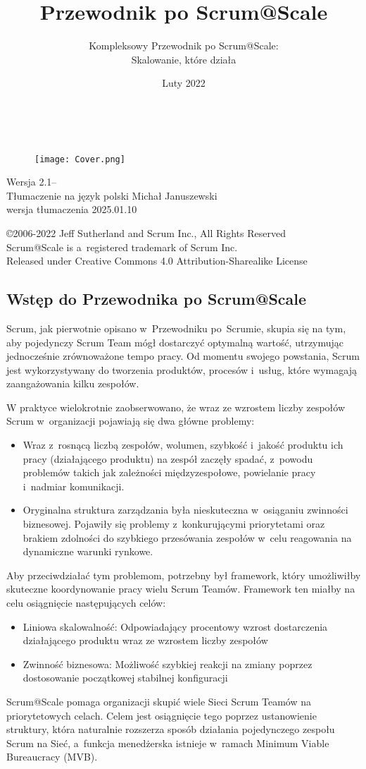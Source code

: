\documentclass[12pt,a4paper,parskip=full]{scrartcl}
\title{Przewodnik po Scrum@Scale}
\subtitle{Kompleksowy Przewodnik po Scrum@Scale:\\ Skalowanie, które działa}
\author{}
\date{Luty 2022}
\makeatletter
\renewcommand{\maketitle}{\begin{titlepage}
    \begin{center}
      \makebox[\textwidth]{\fontsize{40}{40}\selectfont{\color{red}\@title\textsuperscript{\textbf{\textregistered}}}}\\
      \vspace{0.5cm}      	
      \fontsize{20}{20}\selectfont{\color{gray}\@subtitle}
    \end{center}
    \vspace*{1cm}
    \begin{figure}[H]
      \centering
      \texttt{[image: Cover.png]}
    \end{figure}
    \begin{center}    
      \small {
        Wersja \version -- \@date \\
        \vspace{0.3 cm}
        Tłumaczenie na język polski Michał Januszewski\\
        wersja tłumaczenia \translationver
      }
    \end{center}
    \vspace{2.5 cm}
    \begin{center}
      \footnotesize{
        ©2006-2022 Jeff Sutherland and Scrum Inc., All Rights Reserved\\
        Scrum@Scale is a~registered trademark of Scrum Inc.\\
        Released under Creative Commons 4.0 Attribution-Sharealike License
      }
    \end{center}
  \end{titlepage}%
}
\newcommand{\version}{2.1}
\newcommand{\translationver}{2025.01.10}
\makeatother
\begin{document}
\maketitle
\tableofcontents
\subsection{Wstęp do Przewodnika po Scrum@Scale}\label{preface-to-the-ScrumatScale-guide}

Scrum, jak pierwotnie opisano w~Przewodniku po~Scrumie, skupia się na tym, aby pojedynczy Scrum Team mógł dostarczyć optymalną wartość, utrzymując jednocześnie zrównoważone tempo pracy. Od momentu swojego powstania, Scrum jest wykorzystywany do tworzenia produktów, procesów i~usług, które wymagają zaangażowania kilku zespołów.

W praktyce wielokrotnie zaobserwowano, że wraz ze wzrostem liczby zespołów Scrum w~organizacji pojawiają się dwa główne problemy:


\begin{itemize}%
\itemsep10pt
\item
  Wraz z~rosnącą liczbą zespołów, wolumen, szybkość i~jakość produktu ich pracy (działającego produktu) na zespół zaczęły spadać, z~powodu problemów takich jak zależności międzyzespołowe, powielanie pracy i~nadmiar komunikacji.
\item
 Oryginalna struktura zarządzania była nieskuteczna w~osiąganiu zwinności biznesowej. Pojawiły się problemy z~konkurującymi priorytetami oraz brakiem zdolności do szybkiego przesówania zespołów w~celu reagowania na dynamiczne warunki rynkowe.
\end{itemize}

Aby przeciwdziałać tym problemom, potrzebny był framework, który umożliwiłby skuteczne koordynowanie pracy wielu Scrum Teamów. Framework ten miałby na celu osiągnięcie następujących celów:

\begin{itemize}
\itemsep10pt
\item
  Liniowa skalowalność: Odpowiadający procentowy wzrost dostarczenia działającego produktu wraz ze wzrostem liczby zespołów
\item
 Zwinność biznesowa: Możliwość szybkiej reakcji na zmiany poprzez dostosowanie początkowej stabilnej konfiguracji
\end{itemize}

Scrum@Scale pomaga organizacji skupić wiele Sieci Scrum Teamów na priorytetowych celach. Celem jest osiągnięcie tego poprzez ustanowienie struktury, która naturalnie rozszerza sposób działania pojedynczego zespołu Scrum na Sieć, a~funkcja menedżerska istnieje w~ramach Minimum Viable Bureaucracy (MVB).
\end{document}
